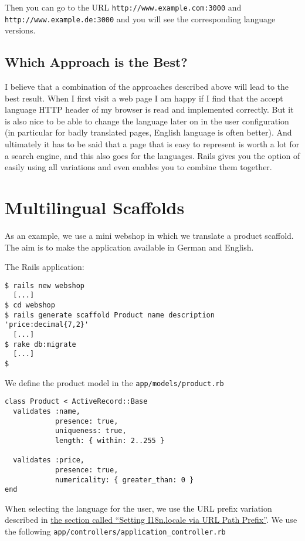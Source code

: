\documentclass[a4paper]{book}
\newcommand{\chap}[1]{\newpage\thispagestyle{empty}\chapter{#1}\label{chap:\thechapter}}
\begin{document}
Then you can go to the URL \texttt{http://www.example.com:3000} and \texttt{http://www.example.de:3000} and you will see the corresponding language versions.

\section{Which Approach is the Best?}\label{which-approach-is-the-best}

I believe that a combination of the approaches described above will lead to the best result. When I first visit a web page I am happy if I find that the accept language HTTP header of my browser is read and implemented correctly. But it is also nice to be able to change the language later on in the user configuration (in particular for badly translated pages, English language is often better). And ultimately it has to be said that a page that is easy to represent is worth a lot for a search engine, and this also goes for the languages. Rails gives you the option of easily using all variations and even enables you to combine them together.

\chap{Multilingual Scaffolds}\label{multilingual-scaffolds}

As an example, we use a mini webshop in which we translate a product scaffold. The aim is to make the application available in German and English.

The Rails application:

\begin{shaded}\begin{verbatim}
$ rails new webshop
  [...]
$ cd webshop
$ rails generate scaffold Product name description 'price:decimal{7,2}'
  [...]
$ rake db:migrate
  [...]
$
\end{verbatim}\end{shaded}

We define the product model in the \texttt{app/models/product.rb}

\begin{shaded}\begin{verbatim}
class Product < ActiveRecord::Base
  validates :name,
            presence: true,
            uniqueness: true,
            length: { within: 2..255 }

  validates :price,
            presence: true,
            numericality: { greater_than: 0 }
end
\end{verbatim}\end{shaded}

When selecting the language for the user, we use the URL prefix variation described in \hyperref[i18nux5furlux5fpathux5fprefix]{the section called “Setting I18n.locale via URL Path Prefix”}. We use the following \texttt{app/controllers/application\_controller.rb}
\end{document}
